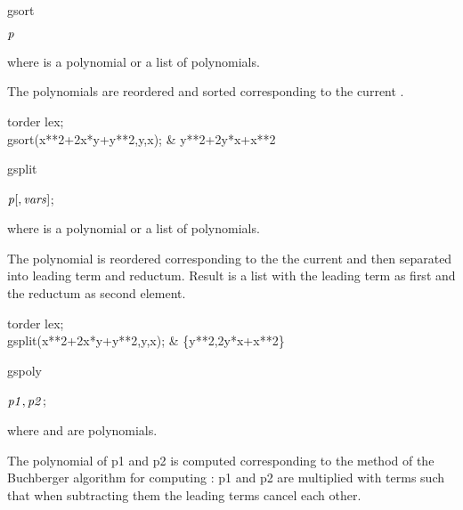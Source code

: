 \begin{Operator}{gsort}
\begin{Syntax}

 \(\meta{p}\)
\end{Syntax}
where  is a polynomial or a list of polynomials.

The polynomials are reordered and sorted corresponding to
the current .
\begin{Examples}

  torder lex;\\  
  gsort(x**2+2x*y+y**2,{y,x});  &  {y**2+2y*x+x**2}

\end{Examples}
\end{Operator}


\begin{Operator}{gsplit}
\begin{Syntax}

 \(\meta{p}[,\meta{vars}]\);
\end{Syntax}
where  is a polynomial or a list of polynomials.

The polynomial is reordered corresponding to the 
the current  and then
separated into leading term and reductum. Result is
a list with the leading term as first and the reductum
as second element.
\begin{Examples}

  torder lex;\\  
  gsplit(x**2+2x*y+y**2,{y,x});  &  \{y**2,2y*x+x**2\}

\end{Examples}
\end{Operator}

\begin{Operator}{gspoly}
\begin{Syntax}

 \(\meta{p1},\meta{p2}\);

\end{Syntax}
where  and  are polynomials.

The  polynomial of p1 and p2 is computed
corresponding to the method of the Buchberger algorithm for
computing : p1 and p2 are multiplied
with terms such that when subtracting them the leading terms 
cancel each other.
\end{Operator}
